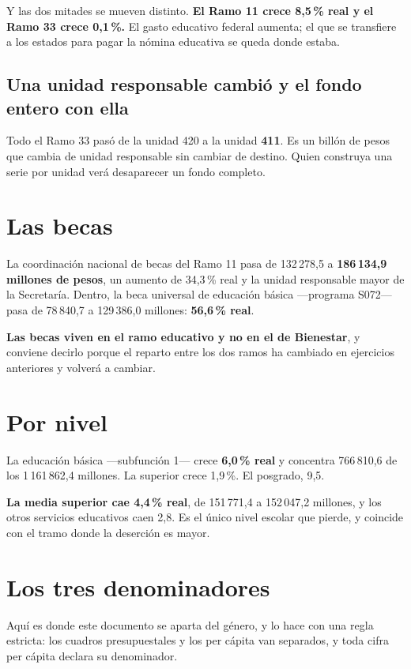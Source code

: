 Y las dos mitades se mueven distinto. \textbf{El Ramo 11 crece 8,5\,\% real y el Ramo 33
crece 0,1\,\%.} El gasto educativo federal aumenta; el que se transfiere a los estados para
pagar la nómina educativa se queda donde estaba.

\subsection{Una unidad responsable cambió y el fondo entero con ella}

Todo el Ramo 33 pasó de la unidad 420 a la unidad \textbf{411}. Es un billón de pesos que
cambia de unidad responsable sin cambiar de destino. Quien construya una serie por unidad
verá desaparecer un fondo completo.

\section{Las becas}

La coordinación nacional de becas del Ramo 11 pasa de 132\,278,5 a \textbf{186\,134,9 millones
de pesos}, un aumento de 34,3\,\% real y la unidad responsable mayor de la Secretaría. Dentro,
la beca universal de educación básica ---programa S072--- pasa de 78\,840,7 a 129\,386,0
millones: \textbf{56,6\,\% real}.

\textbf{Las becas viven en el ramo educativo y no en el de Bienestar}, y conviene decirlo
porque el reparto entre los dos ramos ha cambiado en ejercicios anteriores y volverá a
cambiar.

\section{Por nivel}

La educación básica ---subfunción 1--- crece \textbf{6,0\,\% real} y concentra 766\,810,6 de
los 1\,161\,862,4 millones. La superior crece 1,9\,\%. El posgrado, 9,5.

\textbf{La media superior cae 4,4\,\% real}, de 151\,771,4 a 152\,047,2 millones, y los otros
servicios educativos caen 2,8. Es el único nivel escolar que pierde, y coincide con el tramo
donde la deserción es mayor.

\section{Los tres denominadores}

Aquí es donde este documento se aparta del género, y lo hace con una regla estricta: los
cuadros presupuestales y los per cápita van separados, y toda cifra per cápita declara su
denominador.

